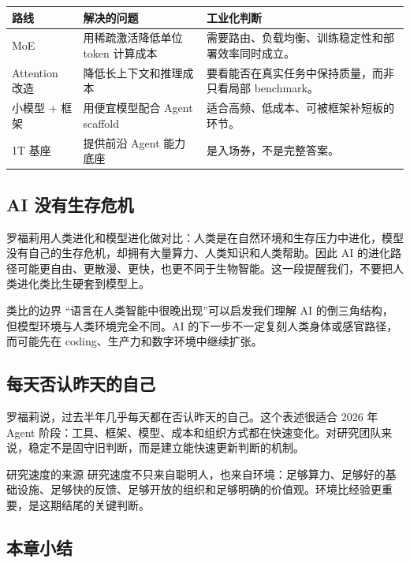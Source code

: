 \documentclass[a4paper]{article}
\begin{document}
\noindent\begin{tabularx}{\textwidth}{p{}p{}X}
\toprule
路线 & 解决的问题 & 工业化判断 \\
\midrule
MoE & 用稀疏激活降低单位 token 计算成本 & 需要路由、负载均衡、训练稳定性和部署效率同时成立。 \\
Attention 改造 & 降低长上下文和推理成本 & 要看能否在真实任务中保持质量，而非只看局部 benchmark。 \\
小模型 + 框架 & 用便宜模型配合 Agent scaffold & 适合高频、低成本、可被框架补短板的环节。 \\
1T 基座 & 提供前沿 Agent 能力底座 & 是入场券，不是完整答案。 \\
\bottomrule
\end{tabularx}

\subsection{AI 没有生存危机}

罗福莉用人类进化和模型进化做对比：人类是在自然环境和生存压力中进化，模型没有自己的生存危机，却拥有大量算力、人类知识和人类帮助。因此 AI 的进化路径可能更自由、更散漫、更快，也更不同于生物智能。这一段提醒我们，不要把人类进化类比生硬套到模型上。

\begin{knowledgebox}{类比的边界}
“语言在人类智能中很晚出现”可以启发我们理解 AI 的倒三角结构，但模型环境与人类环境完全不同。AI 的下一步不一定复刻人类身体或感官路径，而可能先在 coding、生产力和数字环境中继续扩张。
\end{knowledgebox}

\subsection{每天否认昨天的自己}

罗福莉说，过去半年几乎每天都在否认昨天的自己。这个表述很适合 2026 年 Agent 阶段：工具、框架、模型、成本和组织方式都在快速变化。对研究团队来说，稳定不是固守旧判断，而是建立能快速更新判断的机制。

\begin{importantbox}{研究速度的来源}
研究速度不只来自聪明人，也来自环境：足够算力、足够好的基础设施、足够快的反馈、足够开放的组织和足够明确的价值观。环境比经验更重要，是这期结尾的关键判断。
\end{importantbox}

\subsection{本章小结}
\end{document}
